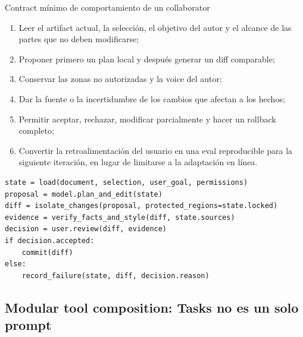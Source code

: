 

\begin{importantbox}{Contract mínimo de comportamiento de un collaborator}
\begin{enumerate}
  \item Leer el artifact actual, la selección, el objetivo del autor y el alcance de las partes que no deben modificarse;
  \item Proponer primero un plan local y después generar un diff comparable;
  \item Conservar las zonas no autorizadas y la voice del autor;
  \item Dar la fuente o la incertidumbre de los cambios que afectan a los hechos;
  \item Permitir aceptar, rechazar, modificar parcialmente y hacer un rollback completo;
  \item Convertir la retroalimentación del usuario en una eval reproducible para la siguiente iteración, en lugar de limitarse a la adaptación en línea.
\end{enumerate}
\end{importantbox}

\begin{lstlisting}[caption={Ciclo de colaboración en documentos con control del usuario}]
state = load(document, selection, user_goal, permissions)
proposal = model.plan_and_edit(state)
diff = isolate_changes(proposal, protected_regions=state.locked)
evidence = verify_facts_and_style(diff, state.sources)
decision = user.review(diff, evidence)
if decision.accepted:
    commit(diff)
else:
    record_failure(state, diff, decision.reason)
\end{lstlisting}


\subsection{Modular tool composition: Tasks no es un solo prompt}

